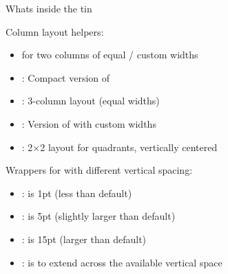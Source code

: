 \documentclass[11pt,compress,t,notes=noshow, xcolor=table]{beamer}
\begin{document}
\begin{frame}[allowframebreaks]{Whats inside the tin}

  Column layout helpers:

  \vfill

  \begin{itemize}
    \item {} for two columns of equal / custom widths
    \item {}: Compact version of 
    \item {}: 3-column layout (equal widths)
    \item {}: Version of  with custom widths
    \item {}: 2$\times$2 layout for quadrants, vertically centered
  \end{itemize}


  \framebreak

  Wrappers for  with different vertical spacing:

  \vfill

  \begin{itemize}
    \item {}:  is 1pt (less than default)
    \item {}:  is 5pt (slightly larger than default)
    \item {}:  is 15pt (larger than default)
    \item {}:  is \code{\\fill} to extend across the available vertical space
  \end{itemize}
\end{frame}
\end{document}
